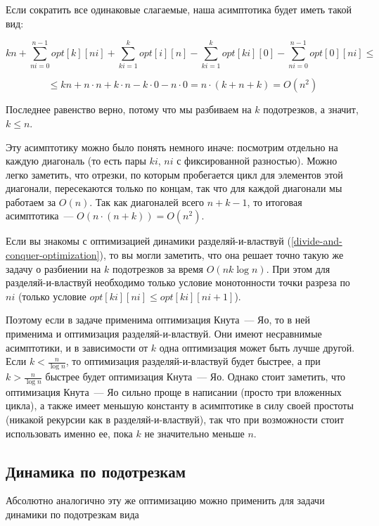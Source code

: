 Если сократить все одинаковые слагаемые, наша асимптотика будет иметь такой вид:

$$kn + \sum_{ni = 0}^{n - 1} opt[k][ni] + \sum_{ki = 1}^k opt[i][n] - \sum_{ki = 1}^{k} opt[ki][0] - \sum_{ni = 0}^{n - 1} opt[0][ni] \le $$

$$ \le kn + n \cdot n + k \cdot n - k \cdot 0 - n \cdot 0 = n \cdot (k + n + k) = O(n^2)$$

Последнее равенство верно, потому что мы разбиваем на $k$ подотрезков, а значит, $k \le n$.

Эту асимптотику можно было понять немного иначе: посмотрим отдельно на каждую диагональ (то есть пары $ki$, $ni$ с фиксированной разностью). Можно легко заметить, что отрезки, по которым пробегается цикл для элементов этой диагонали, пересекаются только по концам, так что для каждой диагонали мы работаем за $O(n)$. Так как диагоналей всего $n + k - 1$, то итоговая асимптотика~--- $O(n \cdot (n + k)) = O(n^2)$.

\begin{observation}
    Если вы знакомы с оптимизацией динамики разделяй-и-властвуй (\ref{divide-and-conquer-optimization}), то вы могли заметить, что она решает точно такую же задачу о разбиении на $k$ подотрезков за время $O(n k \log n)$. При этом для разделяй-и-властвуй необходимо только условие монотонности точки разреза по $ni$ (только условие $opt[ki][ni] \le opt[ki][ni + 1]$).

    Поэтому если в задаче применима оптимизация Кнута~--- Яо, то в ней применима и оптимизация разделяй-и-властвуй. Они имеют несравнимые асимптотики, и в зависимости от $k$ одна оптимизация может быть лучше другой. Если $k < \frac{n}{\log n}$, то оптимизация разделяй-и-властвуй будет быстрее, а при $k > \frac{n}{\log n}$ быстрее будет оптимизация Кнута~--- Яо. Однако стоит заметить, что оптимизация Кнута~--- Яо сильно проще в написании (просто три вложенных цикла), а также имеет меньшую константу в асимптотике в силу своей простоты (никакой рекурсии как в разделяй-и-властвуй), так что при возможности стоит использовать именно ее, пока $k$ не значительно меньше $n$.
\end{observation}

\subsection{Динамика по подотрезкам}

Абсолютно аналогично эту же оптимизацию можно применить для задачи динамики по подотрезкам вида

